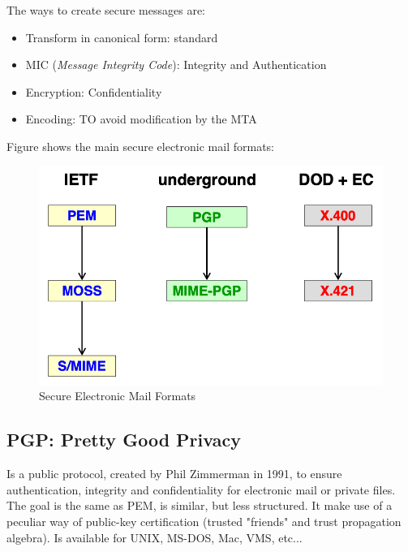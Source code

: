\documentclass[12pt]{article}
\begin{document}
The ways to create secure messages are:
\begin{itemize}
  \item Transform in canonical form: standard
  \item MIC (\textit{Message Integrity Code}): Integrity and Authentication
  \item Encryption: Confidentiality
  \item Encoding: TO avoid modification by the MTA
\end{itemize}
Figure shows the main secure electronic mail formats:
\begin{figure}[H]
   \centering
   \includegraphics[width=\linewidth]{images/smf.png}
   \caption{Secure Electronic Mail Formats}
   \label{fig:smf}
\end{figure}

\subsection{PGP: Pretty Good Privacy}
Is a public protocol, created by Phil Zimmerman in 1991, to ensure authentication, integrity and confidentiality for electronic mail or private files. The goal is the same as PEM, is similar, but less structured. It make use of a peculiar way of public-key certification (trusted "friends" and trust propagation algebra). Is available for UNIX, MS-DOS, Mac, VMS, etc...
\end{document}
